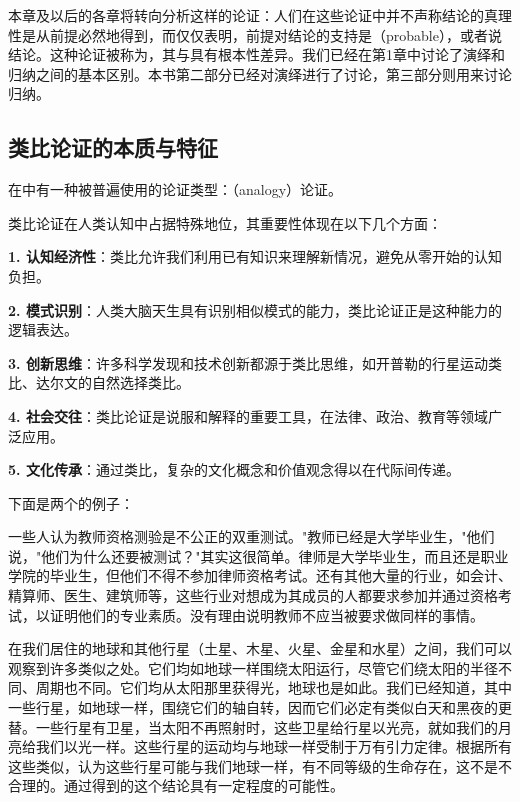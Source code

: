 \begin{theorembox}[title=归纳论证与演绎论证的区别]
本章及以后的各章将转向分析这样的论证：人们在这些论证中并不声称结论的真理性是从前提必然地得到，而仅仅表明，前提对结论的支持是（probable），或者说结论。这种论证被称为，其与具有根本性差异。我们已经在第1章中讨论了演绎和归纳之间的基本区别。本书第二部分已经对演绎进行了讨论，第三部分则用来讨论归纳。
\end{theorembox}

\subsection{类比论证的本质与特征}

在中有一种被普遍使用的论证类型：（analogy）论证。

\begin{theorembox}[title=类比论证的认知基础]
类比论证在人类认知中占据特殊地位，其重要性体现在以下几个方面：

\textbf{1. 认知经济性}：类比允许我们利用已有知识来理解新情况，避免从零开始的认知负担。

\textbf{2. 模式识别}：人类大脑天生具有识别相似模式的能力，类比论证正是这种能力的逻辑表达。

\textbf{3. 创新思维}：许多科学发现和技术创新都源于类比思维，如开普勒的行星运动类比、达尔文的自然选择类比。

\textbf{4. 社会交往}：类比论证是说服和解释的重要工具，在法律、政治、教育等领域广泛应用。

\textbf{5. 文化传承}：通过类比，复杂的文化概念和价值观念得以在代际间传递。
\end{theorembox}

下面是两个的例子：

\begin{examplebox}[title=类比论证实例一：教师资格测验]
一些人认为教师资格测验是不公正的双重测试。"教师已经是大学毕业生，"他们说，"他们为什么还要被测试？"其实这很简单。律师是大学毕业生，而且还是职业学院的毕业生，但他们不得不参加律师资格考试。还有其他大量的行业，如会计、精算师、医生、建筑师等，这些行业对想成为其成员的人都要求参加并通过资格考试，以证明他们的专业素质。没有理由说明教师不应当被要求做同样的事情。\cite{davis1986}
\end{examplebox}

\begin{examplebox}[title=类比论证实例二：行星生命假说]
在我们居住的地球和其他行星（土星、木星、火星、金星和水星）之间，我们可以观察到许多类似之处。它们均如地球一样围绕太阳运行，尽管它们绕太阳的半径不同、周期也不同。它们均从太阳那里获得光，地球也是如此。我们已经知道，其中一些行星，如地球一样，围绕它们的轴自转，因而它们必定有类似白天和黑夜的更替。一些行星有卫星，当太阳不再照射时，这些卫星给行星以光亮，就如我们的月亮给我们以光一样。这些行星的运动均与地球一样受制于万有引力定律。根据所有这些类似，认为这些行星可能与我们地球一样，有不同等级的生命存在，这不是不合理的。通过得到的这个结论具有一定程度的可能性。\cite{reid1785}
\end{examplebox}

